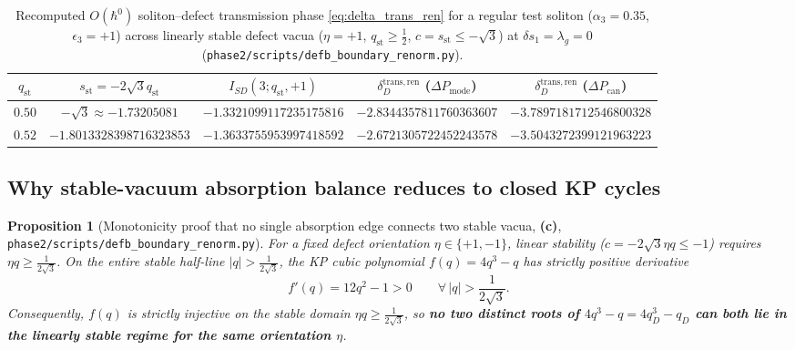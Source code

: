 \documentclass[11pt,a4paper]{article}
\newtheorem{proposition}[theorem]{Proposition}
\theoremstyle{remark}
\newcommand{\hb}{\hbar}
\newcommand{\Lc}{\textbf{(c)}}
\newcommand{\sren}{\texttt{phase2/\allowbreak scripts/\allowbreak defb\_\allowbreak boundary\_\allowbreak renorm.py}}
\begin{document}
\begin{table}[htbp]
\centering
\caption{Recomputed $O(\hb^0)$ soliton--defect transmission phase \eqref{eq:delta_trans_ren}
for a regular test soliton ($\alpha_3 = 0.35$, $\epsilon_3 = +1$) across
linearly stable defect vacua ($\eta = +1$, $q_{\mathrm{st}} \ge \frac{1}{2}$,
$c = s_{\mathrm{st}} \le -\sqrt{3}$) at $\delta s_1 = \lambda_g = 0$ (\sren).}
\label{tab:trans_stable}
\small
\begin{tabular}{@{}ccccc@{}}
\toprule
$q_{\mathrm{st}}$ & $s_{\mathrm{st}} = -2\sqrt{3}q_{\mathrm{st}}$ & $I_{SD}(3;q_{\mathrm{st}},+1)$ & $\delta_D^{\mathrm{trans,ren}}$ ($\Delta P_{\mathrm{mode}}$) & $\delta_D^{\mathrm{trans,ren}}$ ($\Delta P_{\mathrm{can}}$) \\\midrule
$0.50$ & $-\sqrt{3} \approx -1.73205081$ & $-1.3321099117235175816$ & $-2.8344357811760363607$ & $-3.7897181712546800328$ \\
$0.52$ & $-1.8013328398716323853$ & $-1.3633755953997418592$ & $-2.6721305722452243578$ & $-3.5043272399121963223$ \\\bottomrule
\end{tabular}
\end{table}

\subsection{Why stable-vacuum absorption balance reduces to closed KP cycles}

\begin{proposition}[Monotonicity proof that no single absorption edge connects two stable vacua, \Lc, \sren]\label{prop:monotonicity_stable}
For a fixed defect orientation $\eta \in \{+1,-1\}$, linear stability ($c = -2\sqrt{3}\eta q \le -1$)
requires $\eta q \ge \frac{1}{2\sqrt{3}}$. On the entire stable half-line
$|q| > \frac{1}{2\sqrt{3}}$, the KP cubic polynomial $f(q) = 4q^3 - q$ has
strictly positive derivative
\begin{equation}\label{eq:f_prime_pos}
  f'(q) = 12q^2 - 1 > 0 \qquad \forall\,|q| > \frac{1}{2\sqrt{3}}.
\end{equation}
Consequently, $f(q)$ is strictly injective on the stable domain
$\eta q \ge \frac{1}{2\sqrt{3}}$, so \textbf{no two distinct roots of
$4q^3 - q = 4q_D^3 - q_D$ can both lie in the linearly stable regime for the
same orientation $\eta$}.
\end{proposition}
\end{document}
